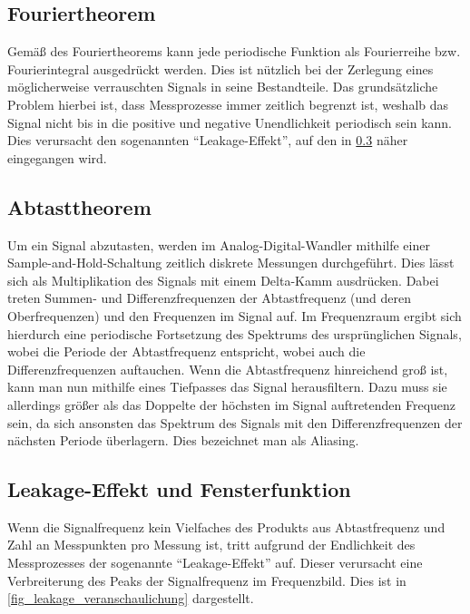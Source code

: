 \documentclass[
a4paper,
12pt,
pagesize,
ngerman
]{scrartcl}
\begin{document}
	\subsection{Fouriertheorem} %
	Gemäß des Fouriertheorems kann jede periodische Funktion als Fourierreihe bzw. Fourierintegral ausgedrückt werden.
	Dies ist nützlich bei der Zerlegung eines möglicherweise verrauschten Signals in seine Bestandteile.
	Das grundsätzliche Problem hierbei ist, dass Messprozesse immer zeitlich begrenzt ist, weshalb das Signal nicht bis in die positive und negative Unendlichkeit periodisch sein kann.
	Dies verursacht den sogenannten \enquote{Leakage-Effekt}, auf den in \cref{leakage} näher eingegangen wird.
	
	\subsection{Abtasttheorem}
	Um ein Signal abzutasten, werden im Analog-Digital-Wandler mithilfe einer Sample-and-Hold-Schaltung zeitlich diskrete Messungen durchgeführt.
	Dies lässt sich als Multiplikation des Signals mit einem Delta-Kamm ausdrücken.
	Dabei treten Summen- und Differenzfrequenzen der Abtastfrequenz (und deren Oberfrequenzen) und den Frequenzen im Signal auf.
	Im Frequenzraum ergibt sich hierdurch eine periodische Fortsetzung des Spektrums des ursprünglichen Signals, wobei die Periode der Abtastfrequenz entspricht, wobei auch die Differenzfrequenzen auftauchen. %
	Wenn die Abtastfrequenz hinreichend groß ist, kann man nun mithilfe eines Tiefpasses das Signal herausfiltern.
	Dazu muss sie allerdings größer als das Doppelte der höchsten im Signal auftretenden Frequenz sein, da sich ansonsten das Spektrum des Signals mit den Differenzfrequenzen der nächsten Periode überlagern.
	Dies bezeichnet man als Aliasing.
	
	
	\subsection{Leakage-Effekt und Fensterfunktion}
	\label{leakage}
	Wenn die Signalfrequenz kein Vielfaches des Produkts aus Abtastfrequenz und Zahl an Messpunkten pro Messung ist, tritt aufgrund der Endlichkeit des Messprozesses der sogenannte \enquote{Leakage-Effekt} auf.
	Dieser verursacht eine Verbreiterung des Peaks der Signalfrequenz im Frequenzbild.
	Dies ist in \cref{fig_leakage_veranschaulichung} dargestellt.
	
\end{document}
